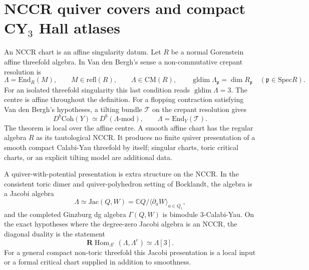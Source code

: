 \providecommand{\Hom}{\mathrm{Hom}}
\providecommand{\End}{\mathrm{End}}
\providecommand{\Ext}{\mathrm{Ext}}
\providecommand{\RHom}{\mathbf{R}\!\operatorname{Hom}}
\providecommand{\Spec}{\mathrm{Spec}}
\providecommand{\Coh}{\mathrm{Coh}}
\providecommand{\Db}{D^{b}}
\providecommand{\Perf}{\mathrm{Perf}}
\providecommand{\Rep}{\mathrm{Rep}}
\providecommand{\CoHA}{\mathrm{CoHA}}
\providecommand{\Jac}{\mathrm{Jac}}
\providecommand{\Crit}{\mathrm{Crit}}
\providecommand{\Tot}{\operatorname{Tot}}
\providecommand{\Eone}{E_{1}}
\providecommand{\Etwo}{E_{2}}
\providecommand{\NCCR}{\mathrm{NCCR}}
\providecommand{\cC}{\mathcal C}
\providecommand{\cE}{\mathcal E}
\providecommand{\cH}{\mathcal H}
\providecommand{\cM}{\mathcal M}
\providecommand{\cO}{\mathcal O}
\providecommand{\cT}{\mathcal T}
\providecommand{\fU}{\mathfrak U}
\providecommand{\Yplus}{Y^{+}}
\providecommand{\kcat}{\kappa_{\mathrm{cat}}}
\providecommand{\kch}{\kappa_{\mathrm{ch}}}
\providecommand{\kBKM}{\kappa_{\mathrm{BKM}}}
\providecommand{\kfib}{\kappa_{\mathrm{fiber}}}
\providecommand{\kHeis}{\kappa_{\mathrm{ch}}^{\mathrm{Heis}}}
\providecommand{\bC}{\mathbb C}
\providecommand{\bP}{\mathbb P}
\providecommand{\bZ}{\mathbb Z}

\section*{NCCR quiver covers and compact CY$_3$ Hall atlases}

An NCCR chart is an affine singularity datum.  Let \(R\) be a normal
Gorenstein affine threefold algebra.  In Van den Bergh's sense a
non-commutative crepant resolution is
\[
  \Lambda=\End_R(M),
  \qquad
  M\in\mathrm{refl}(R),
  \qquad
  \Lambda\in\mathrm{CM}(R),
  \qquad
  \operatorname{gldim}\Lambda_{\mathfrak p}=\dim R_{\mathfrak p}
  \quad(\mathfrak p\in\Spec R).
\]
For an isolated threefold singularity this last condition reads
\(\operatorname{gldim}\Lambda=3\).  The centre is affine throughout the
definition.
For a flopping contraction satisfying Van den Bergh's hypotheses, a
tilting bundle \(\cT\) on the crepant resolution gives
\[
  \Db\Coh(Y)\simeq\Db(\Lambda\text{-}\mathrm{mod}),
  \qquad
  \Lambda=\End_Y(\cT).
\]
The theorem is local over the affine centre.  A smooth affine chart has
the regular algebra \(R\) as its tautological NCCR.  It produces no
finite quiver presentation of a smooth compact Calabi-Yau threefold by
itself; singular charts, toric critical charts, or an explicit tilting
model are additional data.

A quiver-with-potential presentation is extra structure on the NCCR.
In the consistent toric dimer and quiver-polyhedron setting of Bocklandt,
the algebra is a Jacobi algebra
\[
  \Lambda\simeq\Jac(Q,W)
  =
  \bC Q\big/\langle\partial_a W\rangle_{a\in Q_1},
\]
and the completed Ginzburg dg algebra \(\Gamma(Q,W)\) is
bimodule \(3\)-Calabi-Yau.  On the exact hypotheses where the degree-zero
Jacobi algebra is an NCCR, the diagonal duality is the statement
\[
  \RHom_{\Lambda^e}(\Lambda,\Lambda^e)\simeq \Lambda[3].
\]
For a general compact non-toric threefold this Jacobi presentation is a
local input or a formal critical chart supplied in addition to
smoothness.

